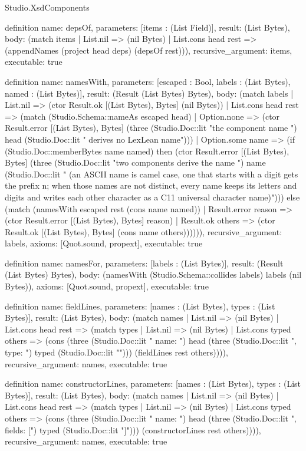 \begin{lexlean}{Studio.XsdComponents}
\begin{semanticmodule}
definition{
  name: depsOf,
  parameters: [items : (List Field)],
  result: (List Bytes),
  body: (match items
    | List.nil => (nil Bytes)
    | List.cons head rest => (appendNames (project head deps) (depsOf rest))),
  recursive_argument: items,
  executable: true
}

definition{
  name: namesWith,
  parameters: [escaped : Bool, labels : (List Bytes), named : (List Bytes)],
  result: (Result (List Bytes) Bytes),
  body: (match labels
    | List.nil => (ctor Result.ok [(List Bytes), Bytes] (nil Bytes))
    | List.cons head rest => (match (Studio.Schema::nameAs escaped head)
      | Option.none => (ctor Result.error [(List Bytes), Bytes] (three (Studio.Doc::lit "the component name ") head (Studio.Doc::lit " derives no LexLean name")))
      | Option.some name => (if (Studio.Doc::memberBytes name named) then (ctor Result.error [(List Bytes), Bytes] (three (Studio.Doc::lit "two components derive the name ") name (Studio.Doc::lit " (an ASCII name is camel case, one that starts with a digit gets the prefix n; when those names are not distinct, every name keeps its letters and digits and writes each other character as a C11 universal character name)"))) else (match (namesWith escaped rest (cons name named))
        | Result.error reason => (ctor Result.error [(List Bytes), Bytes] reason)
        | Result.ok others => (ctor Result.ok [(List Bytes), Bytes] (cons name others)))))),
  recursive_argument: labels,
  axioms: [Quot.sound, propext],
  executable: true
}

definition{
  name: namesFor,
  parameters: [labels : (List Bytes)],
  result: (Result (List Bytes) Bytes),
  body: (namesWith (Studio.Schema::collides labels) labels (nil Bytes)),
  axioms: [Quot.sound, propext],
  executable: true
}

definition{
  name: fieldLines,
  parameters: [names : (List Bytes), types : (List Bytes)],
  result: (List Bytes),
  body: (match names
    | List.nil => (nil Bytes)
    | List.cons head rest => (match types
      | List.nil => (nil Bytes)
      | List.cons typed others => (cons (three (Studio.Doc::lit "    {name: ") head (three (Studio.Doc::lit ", type: ") typed (Studio.Doc::lit "}"))) (fieldLines rest others)))),
  recursive_argument: names,
  executable: true
}

definition{
  name: constructorLines,
  parameters: [names : (List Bytes), types : (List Bytes)],
  result: (List Bytes),
  body: (match names
    | List.nil => (nil Bytes)
    | List.cons head rest => (match types
      | List.nil => (nil Bytes)
      | List.cons typed others => (cons (three (Studio.Doc::lit "    {name: ") head (three (Studio.Doc::lit ", fields: [") typed (Studio.Doc::lit "]}"))) (constructorLines rest others)))),
  recursive_argument: names,
  executable: true
}


\end{semanticmodule}
\end{lexlean}
